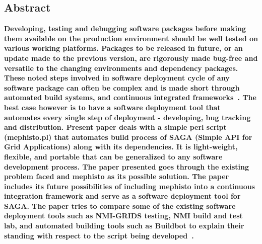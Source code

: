 \documentclass[a4paper,10pt]{article}
\begin{document}
\begin{multicols}{2}
\section*{\normalsize \textbf{Abstract}}
\textbf{Developing, testing and debugging software packages before making them available on the production environment should be well 
tested on various working platforms. Packages to be released in future, or an update made to the previous version, are rigorously
made bug-free and versatile to the changing environments and dependency packages. These noted steps involved in software deployment cycle of 
any software package can often be complex and is made short through automated build systems, and continuous integrated frameworks~\cite{wiki-soft-dep}. 
The best case however is to have a software deployment tool that automates every single step of deployment - developing, bug tracking and distribution. 
Present paper deals with a simple perl script (mephisto.pl) that automates build process of SAGA (Simple API for Grid Applications) along
with its dependencies. It is light-weight, flexible, and portable that can be 
generalized to any software development process. The paper presented goes through the existing problem faced and mephisto 
as its possible solution. The paper includes its future possibilities of including mephisto into a continuous integration framework and serve as a software deployment 
tool for SAGA. The paper tries to compare some of the existing software deployment tools such as NMI-GRIDS testing, NMI build 
and test lab, and automated building tools such as Buildbot to explain their standing with respect to the script being developed~\cite{wiki-buildsofts}. 
}

\end{multicols}
\end{document}
